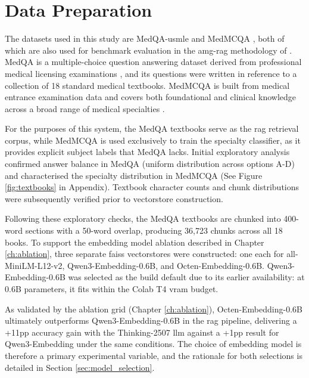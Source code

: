 \chapter{Data Preparation}

The datasets used in this study are MedQA-\gls{usmle} \cite{jin2021} and MedMCQA \cite{pal2022}, both of which are also used for benchmark evaluation in the \gls{amg-rag} methodology of \citet{rezaei2025}. MedQA is a multiple-choice question answering dataset derived from professional medical licensing examinations \cite{jin2021}, and its questions were written in reference to a collection of 18 standard medical textbooks. MedMCQA is built from medical entrance examination data and covers both foundational and clinical knowledge across a broad range of medical specialties \cite{pal2022}. 

For the purposes of this system, the MedQA textbooks serve as the \gls{rag} retrieval corpus, while MedMCQA is used exclusively to train the specialty classifier, as it provides explicit subject labels that MedQA lacks. Initial exploratory analysis confirmed answer balance in MedQA (uniform distribution across options A-D) and characterised the specialty distribution in MedMCQA (See Figure \ref{fig:textbooks} in Appendix). Textbook character counts and chunk distributions were subsequently verified prior to vectorstore construction.

Following these exploratory checks, the MedQA textbooks are chunked into 400-word sections with a 50-word overlap, producing 36,723 chunks across all 18 books. To support the embedding model ablation described in Chapter \ref{ch:ablation}, three separate \gls{faiss} vectorstores were constructed: one each for all-MiniLM-L12-v2, Qwen3-Embedding-0.6B, and Octen-Embedding-0.6B. Qwen3-Embedding-0.6B was selected as the build default due to its earlier availability: at 0.6B parameters, it fits within the Colab T4 \gls{vram} budget. 

As validated by the ablation grid (Chapter \ref{ch:ablation}), Octen-Embedding-0.6B ultimately outperforms Qwen3-Embedding-0.6B in the \gls{rag} pipeline, delivering a +11\gls{pp} accuracy gain with the Thinking-2507 \gls{llm} against a +1\gls{pp} result for Qwen3-Embedding under the same conditions. The choice of embedding model is therefore a primary experimental variable, and the rationale for both selections is detailed in Section \ref{sec:model_selection}.
